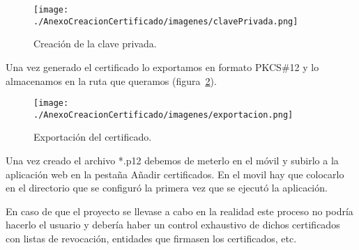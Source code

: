 \begin{figure}
  \centering
    \texttt{[image: ./AnexoCreacionCertificado/imagenes/clavePrivada.png]}
  \caption{Creación de la clave privada.}
  \label{fig:clavePrivada}
\end{figure}

Una vez generado el certificado lo exportamos en formato PKCS\#12 y lo almacenamos en la ruta que queramos (figura~\ref{fig:exportacion}).

\begin{figure}
  \centering
    \texttt{[image: ./AnexoCreacionCertificado/imagenes/exportacion.png]}
  \caption{Exportación del certificado.}
  \label{fig:exportacion}
\end{figure}

Una vez creado el archivo *.p12 debemos de meterlo en el móvil y subirlo a la aplicación web en la pestaña Añadir certificados. En el movil hay que colocarlo en el directorio que se configuró la primera vez que se ejecutó la aplicación.

En caso de que el proyecto se llevase a cabo en la realidad este proceso no podría hacerlo el usuario y debería haber un control exhaustivo de dichos certificados con listas de revocación, entidades que firmasen los certificados, etc.








